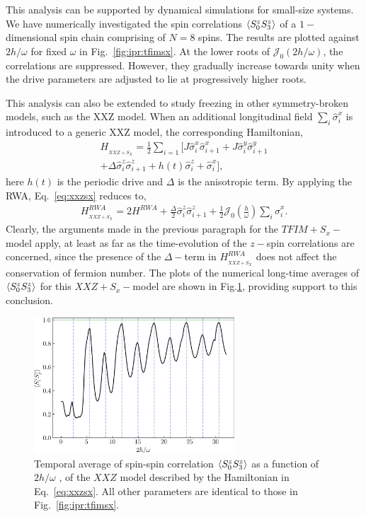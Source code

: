 \documentclass[%
reprint,
superscriptaddress,
amsmath,amssymb,
aps,
prb,
showkeys,
]{revtex4-2}
\begin{document}
This analysis can be supported by dynamical simulations for small-size systems. We have numerically investigated the spin correlations $\expval{S^z_0 S^z_3}$ of a $1-$dimensional spin chain comprising of $N=8$ spins. The results are plotted against $2h/\omega$ for fixed $\omega$ in Fig.~\ref{fig:ipr:tfimsx}. At the lower roots of $\mathcal{J}_0\left(2h/\omega\right)$,  the correlations are suppressed. However,  they  gradually increase towards unity when the drive parameters are adjusted to lie at progressively higher roots.

This analysis can also be extended to study freezing in  other symmetry-broken models, such as the XXZ model. When an additional longitudinal field $\sum_i\hat{\sigma}^x_i$ is introduced to a generic XXZ model, the corresponding Hamiltonian,
\begin{multline}
H_{_{XXZ+S_{X}}} = \frac12 \sum_{i=1} \bigg[ J \hat{\sigma}^x_i \hat{\sigma}^x_{i+1} +J  \hat{\sigma}^y_i \hat{\sigma}^y_{i+1}\\ + \Delta  \hat{\sigma}^z_i \hat{\sigma}^z_{i+1} + h(t)  \hat{\sigma}^z_i + \hat{\sigma}^x_i\bigg],
\label{eq:xxzsx}
\end{multline}
here $h(t)$ is the periodic drive and $\Delta$ is the anisotropic term. By applying the RWA, Eq.~\eqref{eq:xxzsx} reduces to,
\begin{multline}
	H^{RWA}_{_{XXZ+S_{X}}} = 2 H^{RWA} + \frac{\Delta}{2}  \hat{\sigma}^z_i \hat{\sigma}^z_{i+1} +  \frac12 \mathcal{J}_0\left(\frac{h}{\omega}\right)\sum_i\hat{\sigma}^x_i.
\end{multline} 
Clearly, the arguments made in the previous paragraph for the $TFIM+S_x-$model apply, at least as far as the time-evolution of the $z-$spin correlations are concerned, since the presence of the $\Delta-$term in $H^{RWA}_{_{XXZ+S_{X}}}$ does not affect the conservation of fermion number. The plots of the numerical long-time averages of $\expval{S^z_0S^z_3}$ for this $XXZ+S_x-$model are shown
 in Fig.\ref{fig:xxzsx}, providing support to this conclusion.
\begin{figure}[t!]
	\centering
	\includegraphics[width = 7.5cm]{corrN8sz0sz3avg_xxz_sxan0p5.jpeg}
	\caption{Temporal average of spin-spin correlation $\expval{S^z_0 S^z_3}$ as a function of $2h/\omega$ , of the $XXZ$ model described by the Hamiltonian in Eq.~\ref{eq:xxzsx}. All other parameters are identical to those in Fig.~\ref{fig:ipr:tfimsx}.}
	\label{fig:xxzsx}
\end{figure}
\end{document}
